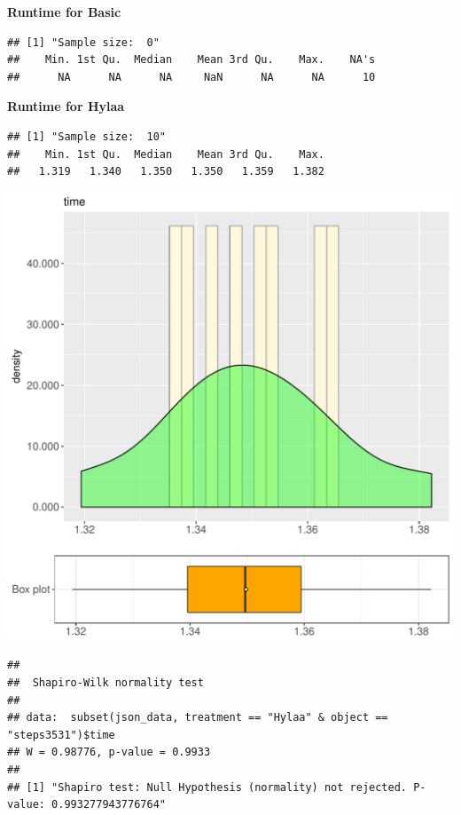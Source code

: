 \documentclass{article}\usepackage[]{graphicx}\usepackage[]{color}
\makeatletter
\def\maxwidth{ %
  \ifdim\Gin@nat@width>\linewidth
    \linewidth
  \else
    \Gin@nat@width
  \fi
}
\newenvironment{kframe}{%
 \def\at@end@of@kframe{}%
 \ifinner\ifhmode%
  \def\at@end@of@kframe{\end{minipage}}%
  \begin{minipage}{\columnwidth}%
 \fi\fi%
 \def\FrameCommand##1{\hskip\@totalleftmargin \hskip-\fboxsep
 \colorbox{shadecolor}{##1}\hskip-\fboxsep
     \hskip-\linewidth \hskip-\@totalleftmargin \hskip\columnwidth}%
 \MakeFramed {\advance\hsize-\width
   \@totalleftmargin\z@ \linewidth\hsize
   \@setminipage}}%
 {\par\unskip\endMakeFramed%
 \at@end@of@kframe}
\newenvironment{knitrout}{}{} %
\makeatother
\begin{document}
 \textbf{Runtime for Basic}
\begin{knitrout}
\color{fgcolor}\begin{kframe}
\begin{verbatim}
## [1] "Sample size:  0"
##    Min. 1st Qu.  Median    Mean 3rd Qu.    Max.    NA's 
##      NA      NA      NA     NaN      NA      NA      10
\end{verbatim}
\end{kframe}
\end{knitrout}
 \textbf{Runtime for Hylaa}
\begin{knitrout}
\color{fgcolor}\begin{kframe}
\begin{verbatim}
## [1] "Sample size:  10"
##    Min. 1st Qu.  Median    Mean 3rd Qu.    Max. 
##   1.319   1.340   1.350   1.350   1.359   1.382
\end{verbatim}
\end{kframe}
\includegraphics[width=\maxwidth]{figure/RH3_Hylaa_steps3531-1} 
\begin{kframe}\begin{verbatim}
## 
## 	Shapiro-Wilk normality test
## 
## data:  subset(json_data, treatment == "Hylaa" & object == "steps3531")$time
## W = 0.98776, p-value = 0.9933
## 
## [1] "Shapiro test: Null Hypothesis (normality) not rejected. P-value: 0.993277943776764"
\end{verbatim}
\end{kframe}
\end{knitrout}
  
\end{document}

